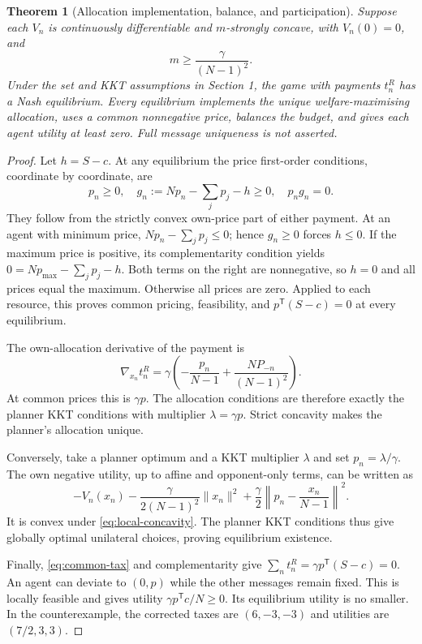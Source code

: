 \documentclass[11pt,a4paper]{article}
\newtheorem{theorem}{Theorem}
\begin{document}
\begin{theorem}[Allocation implementation, balance, and participation]
Suppose each $V_n$ is continuously differentiable and $m$-strongly concave,
with $V_n(0)=0$, and
\begin{equation}
 m\geq\frac{\gamma}{(N-1)^2}.
 \label{eq:local-concavity}
\end{equation}
Under the set and KKT assumptions in Section 1, the game with payments
$t_n^R$ has a Nash equilibrium. Every equilibrium implements the unique
welfare-maximising allocation, uses a common nonnegative price, balances
the budget, and gives each agent utility at least zero. Full message
uniqueness is not asserted.
\label{thm:static}
\end{theorem}

\begin{proof}
Let $h=S-c$. At any equilibrium the price first-order conditions, coordinate
by coordinate, are
\begin{equation}
 p_n\geq0,\quad
 g_n:=Np_n-\sum_jp_j-h\geq0,\quad p_ng_n=0.
 \label{eq:price-kkt}
\end{equation}
They follow from the strictly convex own-price part of either payment.
At an agent with minimum price, $Np_n-\sum_jp_j\leq0$; hence $g_n\geq0$
forces $h\leq0$. If the maximum price is positive, its complementarity
condition yields
$0=Np_{\max}-\sum_jp_j-h$. Both terms on the right are nonnegative,
so $h=0$ and all prices equal the maximum. Otherwise all prices are zero.
Applied to each resource, this proves common pricing, feasibility, and
$p^{\mathsf T}(S-c)=0$ at every equilibrium.

The own-allocation derivative of the payment is
\begin{equation}
 \nabla_{x_n}t_n^R=
 \gamma\left(-\frac{p_n}{N-1}
             +\frac{N P_{-n}}{(N-1)^2}\right).
 \label{eq:allocation-gradient}
\end{equation}
At common prices this is $\gamma p$. The allocation conditions are
therefore exactly the planner KKT conditions with multiplier $\lambda=\gamma p$.
Strict concavity makes the planner's allocation unique.

Conversely, take a planner optimum and a KKT multiplier $\lambda$ and set
$p_n=\lambda/\gamma$. The own negative utility, up to affine and opponent-only
terms, can be written as
\begin{equation}
 -V_n(x_n)-\frac{\gamma}{2(N-1)^2}\|x_n\|^2
 +\frac{\gamma}{2}\left\|p_n-\frac{x_n}{N-1}\right\|^2.
\end{equation}
It is convex under \eqref{eq:local-concavity}. The planner KKT conditions
thus give globally optimal unilateral choices, proving equilibrium existence.

Finally, \eqref{eq:common-tax} and complementarity give
$\sum_n t_n^R=\gamma p^{\mathsf T}(S-c)=0$. An agent can deviate to
$(0,p)$ while the other messages remain fixed. This is locally feasible
and gives utility $\gamma p^{\mathsf T}c/N\geq0$. Its equilibrium utility
is no smaller. In the counterexample, the corrected taxes are $(6,-3,-3)$
and utilities are $(7/2,3,3)$.
\end{proof}
\end{document}
